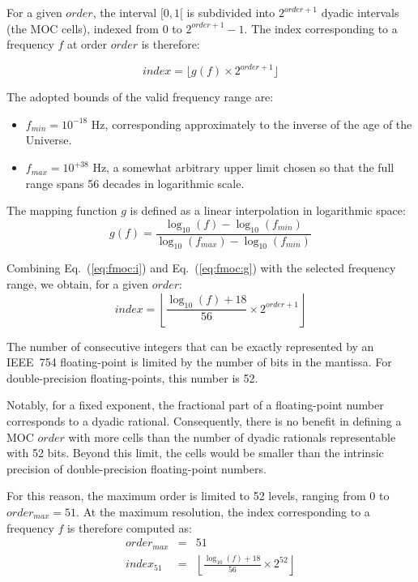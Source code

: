 \documentclass[11pt,a4paper]{ivoa}
\begin{document}
For a given $order$, the interval $[0,1[$ is subdivided into $2^{order+1}$ dyadic intervals (the MOC cells),
indexed from $0$ to $2^{order+1}-1$.
The index corresponding to a frequency $f$ at order $order$ is therefore:

\begin{equation}
  index = \lfloor g(f) \times 2^{order+1} \rfloor
  \label{eq:fmoc:i}
\end{equation}

The adopted bounds of the valid frequency range are:
\begin{itemize}
  \item $f_{min} = 10^{-18}$ Hz, corresponding approximately to the inverse of the age of the Universe.
  \item $f_{max} = 10^{+38}$ Hz, a somewhat arbitrary upper limit chosen so that the full range spans 56 decades in logarithmic scale.
\end{itemize}

The mapping function $g$ is defined as a linear interpolation in logarithmic space:
\begin{equation}
  g(f) = \frac{\log_{10}(f) - \log_{10}(f_{min})}{\log_{10}(f_{max}) - \log_{10}(f_{min})}
  \label{eq:fmoc:g}
\end{equation}

Combining Eq.~(\ref{eq:fmoc:i}) and Eq.~(\ref{eq:fmoc:g}) with the selected frequency range,
we obtain, for a given $order$:
\begin{equation}
  index = \left\lfloor
  \frac{\log_{10}(f) + 18}{56} \times 2^{order+1}
  \right\rfloor
\end{equation}

The number of consecutive integers that can be exactly represented by an
IEEE~754 floating-point is limited by the number of bits in the mantissa.
For double-precision floating-points, this number is 52.

Notably, for a fixed exponent, the fractional part of a floating-point number
corresponds to a dyadic rational. Consequently, there is no benefit in defining
a MOC $order$ with more cells than the number of dyadic rationals representable
with 52 bits.
Beyond this limit, the cells would be smaller than the intrinsic precision of
double-precision floating-point numbers.

For this reason, the maximum order is limited to 52 levels, ranging from 0 to
$order_{max} = 51$.
At the maximum resolution, the index corresponding to a frequency $f$ is
therefore computed as:
\begin{eqnarray*}
  order_{max} &=& 51 \\
  index_{51}  &=& \left\lfloor
  \frac{\log_{10}(f) + 18}{56} \times 2^{52}
  \right\rfloor
\end{eqnarray*}
\end{document}
